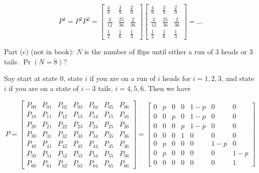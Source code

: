 \begin{solution}
\[
P^4 = P^2 P^2 = \begin{bmatrix}
\frac{4}{9} & \frac{3}{9} & \frac{2}{9}  \\
\frac{3}{12} & \frac{25}{36} & \frac{2}{36} \\
\frac{1}{2} & \frac{1}{6} & \frac{1}{3}
\end{bmatrix}  \begin{bmatrix}
\frac{4}{9} & \frac{3}{9} & \frac{2}{9}  \\
\frac{3}{12} & \frac{25}{36} & \frac{2}{36} \\
\frac{1}{2} & \frac{1}{6} & \frac{1}{3}
\end{bmatrix} = \ldots
\]

\end{solution}

\begin{example}

Part (c) (not in book): \(N\) is the number of flips until either a run of 3 heads or 3 tails. \(\Pr(N = 8)\)?

\end{example}

\begin{solution} Say start at state 0, state \(i\) if you are on a run of \(i\) heads for \(i = 1, 2, 3\), and state \(i\) if you are on a state of \(i-3\) tails, \(i = 4, 5, 6\). Then we have

\[
P = \begin{bmatrix}
P_{00} & P_{01} & P_{02} & P_{03} & P_{04} & P_{05} & P_{06}  \\
P_{10} & P_{11} & P_{12}  & P_{13} & P_{14} & P_{15} & P_{16} \\
P_{20} & P_{21} & P_{22}  & P_{23} & P_{24} & P_{25} & P_{26} \\
P_{30} & P_{31} & P_{32}  & P_{33} & P_{34} & P_{35} & P_{36} \\
P_{40} & P_{41} & P_{42}  & P_{43} & P_{44} & P_{45} & P_{46} \\
P_{50} & P_{51} & P_{52}  & P_{53} & P_{54} & P_{55} & P_{56} \\
P_{60} & P_{61} & P_{62}  & P_{63} & P_{64} & P_{65} & P_{66}
\end{bmatrix} = \begin{bmatrix}
0 & p & 0 &0 & 1-p & 0& 0 \\
0 & 0 & p  & 0 & 1-p & 0 &0\\
0 &0 & 0  &p & 1-p& 0& 0 \\
0 & 0 & 0 &1 & 0 & 0 & 0 \\
0 &p & 0  & 0 & 0&1-p &0 \\
0 & p & 0 &0 & 0 & 0&1-p \\
0 & 0 & 0  &0 & 0 & 0 &1
\end{bmatrix}
\]

\end{solution}

